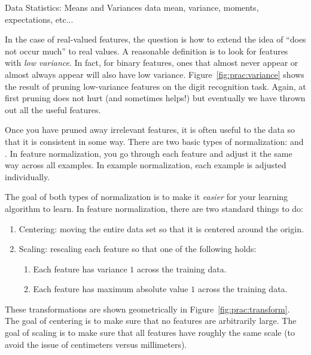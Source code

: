 \begin{mathreview}{Data Statistics: Means and Variances}
  data mean, variance, moments, expectations, etc...
\end{mathreview}


In the case of real-valued features, the question is how to extend the
idea of ``does not occur much'' to real values.  A reasonable
definition is to look for features with \emph{low variance}.  In fact,
for binary features, ones that almost never appear or almost always
appear will also have low variance.  Figure~\ref{fig:prac:variance}
shows the result of pruning low-variance features on the digit
recognition task.  Again, at first pruning does not hurt (and
sometimes helps!) but eventually we have thrown out all the useful
features.


Once you have pruned away irrelevant features, it is often useful to
 the data so that it is consistent in some way.
There are two basic types of normalization:  and .  In feature
normalization, you go through each feature and adjust it the same way
across all examples.  In example normalization, each example is
adjusted individually.


The goal of both types of normalization is to make it \emph{easier}
for your learning algorithm to learn.  In feature normalization, there
are two standard things to do:
\begin{enumerate}
\item Centering: moving the entire data set so that it is centered
  around the origin.
\item Scaling: rescaling each feature so that one of the following
  holds:
\begin{enumerate}
\item Each feature has variance $1$ across the training data.
\item Each feature has maximum absolute value $1$ across the training
  data.
\end{enumerate}
\end{enumerate}
These transformations are shown geometrically in
Figure~\ref{fig:prac:transform}.  The goal of centering is to make
sure that no features are arbitrarily large.  The goal of scaling is
to make sure that all features have roughly the same scale (to avoid
the issue of centimeters versus millimeters).

